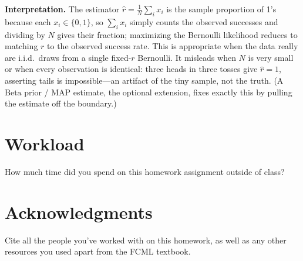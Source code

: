 \documentclass[11pt]{article}
\begin{document}
{\medskip
\noindent\textbf{Interpretation.} The estimator $\hat{r}=\frac{1}{N}\sum_i x_i$
is the sample proportion of 1's because each $x_i\in\{0,1\}$, so $\sum_i x_i$
simply counts the observed successes and dividing by $N$ gives their fraction;
maximizing the Bernoulli likelihood reduces to matching $r$ to the observed
success rate. This is appropriate when the data really are i.i.d.\ draws from a
single fixed-$r$ Bernoulli. It misleads when $N$ is very small or when every
observation is identical: three heads in three tosses give $\hat{r}=1$, asserting
tails is impossible---an artifact of the tiny sample, not the truth. (A
$\mathrm{Beta}$ prior / MAP estimate, the optional extension, fixes exactly this
by pulling the estimate off the boundary.)

}


\section{Workload}

How much time did you spend on this homework assignment outside of class?

\section*{Acknowledgments}

Cite all the people you've worked with on this homework, as well as any other
resources you used apart from the FCML textbook.
\end{document}
